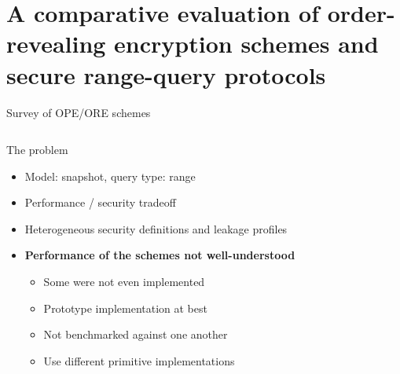 \section{A comparative evaluation of order-revealing encryption schemes and secure range-query protocols~\cite{ore-benchmark-17}}

	\begin{frame}{Survey of OPE/ORE schemes~\cite{ore-benchmark-17}}

		\begin{columns}[T,onlytextwidth]

				\begin{block}{The problem}

					\begin{itemize}
						\item Model: \alert{snapshot}, query type: \alert{range}
						\item Performance / security tradeoff
						\item Heterogeneous security definitions and leakage profiles
						\item \textbf{Performance of the schemes not well-understood}
						\begin{itemize}
							\item Some were not even implemented
							\item Prototype implementation at best
							\item Not benchmarked against one another
							\item Use different primitive implementations
						\end{itemize}
					\end{itemize}

				\end{block}



		\end{columns}

	\end{frame}

